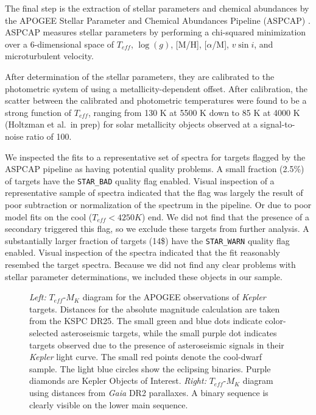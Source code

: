 \documentclass[manuscript]{aastex6}
\newcommand{\vsini}{\ensuremath{v \sin i}}
\newcommand{\Kepler}{\mbox{\textit{Kepler}}}
\newcommand{\Gaia}{\mbox{\textit{Gaia}}}
\newcommand{\Teff}{\ensuremath{T_{eff}}}
\newcommand{\logg}{\ensuremath{\log(g)}}
\newcommand{\STARBAD}{\texttt{STAR\_BAD}}
\newcommand{\STARWARN}{\texttt{STAR\_WARN}}
\begin{document}
The final step is the extraction of stellar parameters and chemical abundances
by the APOGEE Stellar Parameter and Chemical Abundances Pipeline (ASPCAP)
\citep{GarciaPerez16}. ASPCAP measures stellar parameters by performing a
chi-squared minimization \citep{AllendePrieto06} over a 6-dimensional space of
\Teff, \logg, [M/H], [\(\alpha\)/M], \vsini, and microturbulent velocity.

After determination of the stellar parameters, they are calibrated to the
photometric system of \citet{GonzalezHernandez09} using a metallicity-dependent
offset. After calibration, the scatter between the calibrated and photometric
temperatures  were found to be a strong function of \Teff{}, ranging from 130 
K at 5500 K down to 85 K at 4000 K (Holtzman et al.\ in prep) for solar
metallicity objects observed at a signal-to-noise ratio of 100. 

We inspected the fits to a representative set of spectra for targets flagged 
by the ASPCAP pipeline as having potential quality problems. A small fraction
(2.5\%) of targets have the \STARBAD{} quality flag enabled. Visual inspection
of a representative sample of spectra indicated that the flag was largely the
result of poor subtraction or normalization of the spectrum in the pipeline. Or
due to poor model fits on the cool (\(\Teff < 4250 K\)) end. We did not find
that the presence of a secondary triggered this flag, so we exclude these
targets from further analysis. A substantially larger fraction of targets
(14\$) have the \STARWARN{} quality flag enabled. Visual inspection of the
spectra indicated that the fit reasonably resembed the target spectra. Because
we did not find any clear problems with stellar parameter determinations, we 
included these objects in our sample.

\begin{figure}[htb]
    \centering
    \caption{\emph{Left:} \Teff-\(M_K\) diagram for the APOGEE observations of
        \Kepler{} targets. Distances for the absolute magnitude calculation are
        taken from the KSPC DR25. The small green and blue dots indicate
        color-selected asteroseismic targets, while the small purple dot
        indicates targets observed due to the presence of asteroseismic signals
        in their \Kepler{} light curve. The small red points denote the
        cool-dwarf sample. The light blue circles show the eclipsing binaries.
        Purple diamonds are Kepler Objects of Interest. \emph{Right:} 
        \Teff-\(M_K\) diagram using distances from \Gaia{} DR2 parallaxes. A binary sequence is clearly
visible on the lower main sequence.}\label{fig:apogee_selection}
\end{figure}
\end{document}
